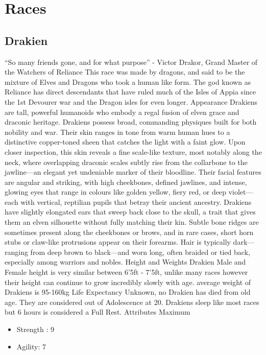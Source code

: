 \documentclass[12pt]{article}
\begin{document}
\section{Races}
\begin{multicols}{2}
\subsection{Drakien}
“So many friends gone, and for what purpose” - Victor Drakor, Grand Master of the Watchers of Reliance
This race was made by dragons, and said to be the mixture of Elves and Dragons who took a human like form. The god known as Reliance has direct descendants that have ruled much of the Isles of Appia since the 1st Devourer war and the Dragon isles for even longer.
Appearance
Drakiens are tall, powerful humanoids who embody a regal fusion of elven grace and draconic heritage. Drakiens possess broad, commanding physiques built for both nobility and war. Their skin ranges in tone from warm human hues to a distinctive copper-toned sheen that catches the light with a faint glow. Upon closer inspection, this skin reveals a fine scale-like texture, most notably along the neck, where overlapping draconic scales subtly rise from the collarbone to the jawline—an elegant yet undeniable marker of their bloodline.
Their facial features are angular and striking, with high cheekbones, defined jawlines, and intense, glowing eyes that range in colours like golden yellow, fiery red, or deep violet—each with vertical, reptilian pupils that betray their ancient ancestry. Drakiens have slightly elongated ears that sweep back close to the skull, a trait that gives them an elven silhouette without fully matching their kin. 
Subtle bone ridges are sometimes present along the cheekbones or brows, and in rare cases, short horn stubs or claw-like protrusions appear on their forearms. Hair is typically dark—ranging from deep brown to black—and worn long, often braided or tied back, especially among warriors and nobles.
Height and Weights
Drakien Male and Female height is very similar between 6'5ft - 7'5ft, unlike many races however their height can continue to grow incredibly slowly with age. average weight of Drakiens is 95-160kg
Life Expectancy
Unknown, no Drakien has died from old age. They are considered out of Adolescence at 20. Drakiens sleep like most races but 6 hours is considered a Full Rest.
Attributes Maximum
\begin{itemize}
\item Strength : 9
\item Agility: 7

\end{itemize}
\end{multicols}
\end{document}
